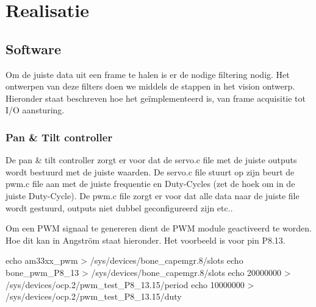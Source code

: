 \chapter{Realisatie}
\label{chap:realisation}


\section{Software}

Om de juiste data uit een frame te halen is er de nodige filtering nodig.
Het ontwerpen van deze filters doen we middels de stappen in het vision ontwerp.
Hieronder staat beschreven hoe het geïmplementeerd is, van frame acquisitie tot
I/O aansturing.











\subsection{Pan \& Tilt controller}
\label{sub:panTiltContr}
De pan \& tilt controller zorgt er voor dat de servo.c file met de juiste outputs
wordt bestuurd met de juiste waarden. De servo.c file stuurt op zijn beurt de pwm.c
file aan met de juiste frequentie en Duty-Cycles (zet de hoek om in de juiste
Duty-Cycle). De pwm.c file zorgt er voor dat alle data naar de juiste file wordt
gestuurd, outputs niet dubbel geconfigureerd zijn etc..

Om een PWM signaal te genereren dient de PWM module geactiveerd te worden. Hoe
dit kan in Angström staat hieronder. Het voorbeeld is voor pin P8.13.

\begin{cppcode}
echo am33xx_pwm > /sys/devices/bone_capemgr.8/slots
echo bone_pwm_P8_13 > /sys/devices/bone_capemgr.8/slots
echo 20000000 > /sys/devices/ocp.2/pwm_test_P8_13.15/period
echo 10000000 > /sys/devices/ocp.2/pwm_test_P8_13.15/duty
\end{cppcode}

